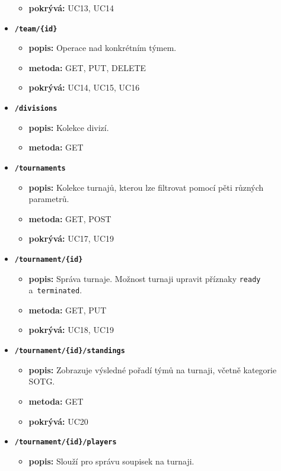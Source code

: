 \begin{itemize}
\begin{itemize}
    \item \textbf{pokrývá:} UC13, UC14
  \end{itemize}
  \item \texttt{\textbf{/team/\{id\}}}
  \begin{itemize}
    \item \textbf{popis:} Operace nad konkrétním týmem.
    \item \textbf{metoda:} GET, PUT, DELETE
    \item \textbf{pokrývá:} UC14, UC15, UC16
  \end{itemize}
  \item \texttt{\textbf{/divisions}}
  \begin{itemize}
    \item \textbf{popis:} Kolekce divizí.
    \item \textbf{metoda:} GET
  \end{itemize}
  \item \texttt{\textbf{/tournaments}}
  \begin{itemize}
    \item \textbf{popis:} Kolekce turnajů, kterou lze filtrovat pomocí pěti různých parametrů.
    \item \textbf{metoda:} GET, POST
    \item \textbf{pokrývá:} UC17, UC19
  \end{itemize}
  \item \texttt{\textbf{/tournament/\{id\}}}
  \begin{itemize}
    \item \textbf{popis:} Správa turnaje. Možnost turnaji upravit příznaky \texttt{ready} a~\texttt{terminated}.
    \item \textbf{metoda:} GET, PUT
    \item \textbf{pokrývá:} UC18, UC19
  \end{itemize}
  \item \texttt{\textbf{/tournament/\{id\}/standings}}
  \begin{itemize}
    \item \textbf{popis:} Zobrazuje výsledné pořadí týmů na turnaji, včetně kategorie SOTG.
    \item \textbf{metoda:} GET
    \item \textbf{pokrývá:} UC20
  \end{itemize}
  \item \texttt{\textbf{/tournament/\{id\}/players}}
  \begin{itemize}
    \item \textbf{popis:} Slouží pro správu soupisek na turnaji.

\end{itemize}
\end{itemize}
